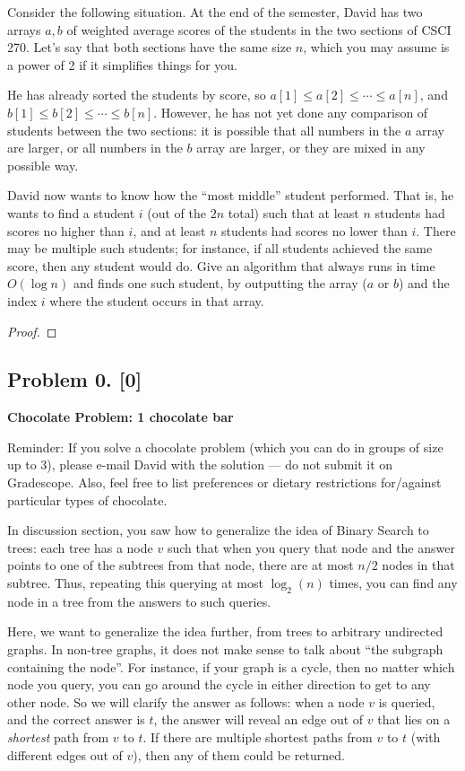 \documentclass[10pt]{article}
\begin{document}
  Consider the following situation. At the end of the semester, David has two arrays $a,b$ of weighted average scores of the students in the two sections of CSCI 270. Let's say that both sections have the same size $n$, which you may assume is a power of 2 if it simplifies things for you.

  He has already sorted the students by score, so $a[1] \leq a[2] \leq \cdots \leq a[n]$, and $b[1] \leq b[2] \leq \cdots \leq b[n]$. However, he has not yet done any comparison of students between the two sections: it is possible that all numbers in the $a$ array are larger, or all numbers in the $b$ array are larger, or they are mixed in any possible way.

  David now wants to know how the ``most middle'' student performed. That is, he wants to find a student $i$ (out of the $2n$ total) such that at least $n$ students had scores no higher than $i$, and at least $n$ students had scores no lower than $i$. There may be multiple such students; for instance, if all students achieved the same score, then any student would do. Give an algorithm that always runs in time $O(\log n)$ and finds one such student, by outputting the array ($a$ or $b$) and the index $i$ where the student occurs in that array. 

\begin{proof}
  
\end{proof}


\subsection*{Problem 0. [0]}
\textbf{Chocolate Problem: 1 chocolate bar}

Reminder: If you solve a chocolate problem (which you can do in groups of size up to 3), please e-mail David with the solution --- do not submit it on Gradescope. Also, feel free to list preferences or dietary restrictions for/against particular types of chocolate.

In discussion section, you saw how to generalize the idea of Binary Search to trees: each tree has a node $v$ such that when you query that node and the answer points to one of the subtrees from that node, there are at most $n/2$ nodes in that subtree. Thus, repeating this querying at most $\log_2 (n)$ times, you can find any node in a tree from the answers to such queries.

Here, we want to generalize the idea further, from trees to arbitrary undirected graphs. In non-tree graphs, it does not make sense to talk about ``the subgraph containing the node''. For instance, if your graph is a cycle, then no matter which node you query, you can go around the cycle in either direction to get to any other node. So we will clarify the answer as follows: when a node $v$ is queried, and the correct answer is $t$, the answer will reveal an edge out of $v$ that lies on a \emph{shortest} path from $v$ to $t$. If there are multiple shortest paths from $v$ to $t$ (with different edges out of $v$), then any of them could be returned.
\end{document}
